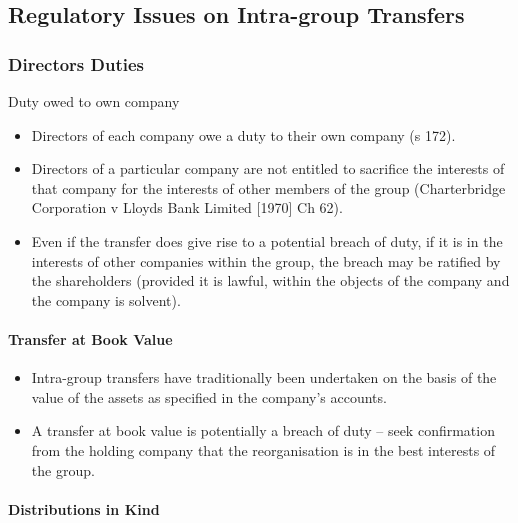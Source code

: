 \documentclass[
]{article}
\providecommand{\tightlist}{%
  \setlength{\itemsep}{0pt}\setlength{\parskip}{0pt}}
\begin{document}
\hypertarget{regulatory-issues-on-intra-group-transfers}{%
\subsection{Regulatory Issues on Intra-group
Transfers}\label{regulatory-issues-on-intra-group-transfers}}

\hypertarget{directors-duties}{%
\subsubsection{Directors Duties}\label{directors-duties}}

Duty owed to own company

\begin{itemize}
\tightlist
\item
  Directors of each company owe a duty to their own company (s 172).
\item
  Directors of a particular company are not entitled to sacrifice the
  interests of that company for the interests of other members of the
  group (Charterbridge Corporation v Lloyds Bank Limited {[}1970{]} Ch
  62).
\item
  Even if the transfer does give rise to a potential breach of duty, if
  it is in the interests of other companies within the group, the breach
  may be ratified by the shareholders (provided it is lawful, within the
  objects of the company and the company is solvent).
\end{itemize}

\hypertarget{transfer-at-book-value}{%
\paragraph{Transfer at Book Value}\label{transfer-at-book-value}}

\begin{itemize}
\tightlist
\item
  Intra-group transfers have traditionally been undertaken on the basis
  of the value of the assets as specified in the company's accounts.
\item
  A transfer at book value is potentially a breach of duty -- seek
  confirmation from the holding company that the reorganisation is in
  the best interests of the group.
\end{itemize}

\hypertarget{distributions-in-kind}{%
\paragraph{Distributions in Kind}\label{distributions-in-kind}}
\end{document}
